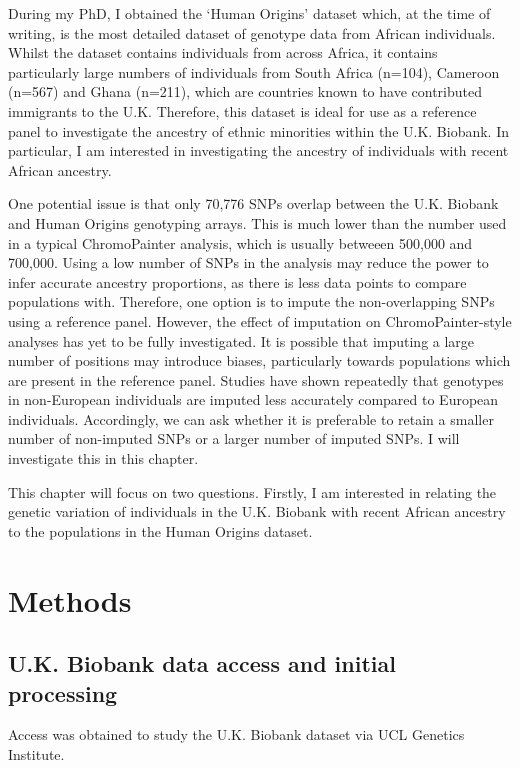 During my PhD, I obtained the `Human Origins' dataset which, at the time of writing, is the most detailed dataset of genotype data from African individuals. Whilst the dataset contains individuals from across Africa, it contains particularly large numbers of individuals from South Africa (n=104), Cameroon (n=567) and Ghana (n=211), which are countries known to have contributed immigrants to the U.K. Therefore, this dataset is ideal for use as a reference panel to investigate the ancestry of ethnic minorities within the U.K. Biobank. In particular, I am interested in investigating the ancestry of individuals with recent African ancestry. 

One potential issue is that only 70,776 SNPs overlap between the U.K. Biobank and Human Origins genotyping arrays. This is much lower than the number used in a typical ChromoPainter analysis, which is usually betweeen 500,000 and 700,000. Using a low number of SNPs in the analysis may reduce the power to infer accurate ancestry proportions, as there is less data points to compare populations with. Therefore, one option is to impute the non-overlapping SNPs using a reference panel. However, the effect of imputation on ChromoPainter-style analyses has yet to be fully investigated. It is possible that imputing a large number of positions may introduce biases, particularly towards populations which are present in the reference panel. Studies have shown repeatedly that genotypes in non-European individuals are imputed less accurately compared to European individuals. Accordingly, we can ask whether it is preferable to retain a smaller number of non-imputed SNPs or a larger number of imputed SNPs. I will investigate this in this chapter. 

This chapter will focus on two questions. Firstly, I am interested in relating the genetic variation of individuals in the U.K. Biobank with recent African ancestry to the populations in the Human Origins dataset. 


\section{Methods}

\subsection{U.K. Biobank data access and initial processing}

Access was obtained to study the U.K. Biobank dataset via UCL Genetics Institute. 

